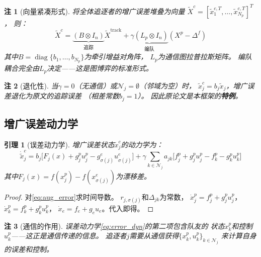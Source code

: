 \documentclass[11pt,a4paper]{article}
\newtheorem{lemma}[theorem]{引理}
\newtheorem{remark}{注}
\DeclareMathOperator{\diag}{diag}
\begin{document}
\begin{remark}[向量紧凑形式]\label{rmk:compact}
  将全体追逐者的增广误差堆叠为向量
  $\tilde{X}^c = [\tilde{x}_1^{c,T}, \ldots, \tilde{x}_{N_p}^{c,T}]^T$，
  则：
  \begin{equation}\label{eq:compact_error}
    \tilde{X}^c = \underbrace{(B \otimes I_n)}_{\text{追踪}} \tilde{X}^{\mathrm{track}}
    + \underbrace{\gamma (L_p \otimes I_n)}_{\text{编队}} (X^p - \Delta^f)
  \end{equation}
  其中$B = \diag\{b_1, \ldots, b_{N_p}\}$为牵引增益对角阵，
  $L_p$为通信图拉普拉斯矩阵。
  编队耦合完全由$L_p$决定——这是图博弈的标准形式\cite{lopez2020}。
\end{remark}

\begin{remark}[退化性]
  当$\gamma = 0$（无通信）或$\mathcal{N}_j = \emptyset$（邻域为空）时，
  $\tilde{x}_j^c = b_j \tilde{x}_j$，增广误差退化为原文的追踪误差
  （相差常数$b_j = 1$）。
  因此原论文是本框架的\textbf{特例}。
\end{remark}


\subsection{增广误差动力学}

\begin{lemma}[误差动力学]\label{lem:error_dyn}
  增广误差状态$\tilde{x}_j^c$的动力学为：
  \begin{equation}\label{eq:error_dyn}
    \dot{\tilde{x}}_j^c =
    b_j \big[F_j(x) + g_j^p u_j^p - g_{\sigma(j)}^e u_{\sigma(j)}^e\big]
    + \gamma \sum_{k \in \mathcal{N}_j} a_{jk}
      \big[f_j^p + g_j^p u_j^p - f_k^p - g_k^p u_k^p\big]
  \end{equation}
  其中$F_j(x) = f(x_j^p) - f(x_{\sigma(j)}^e)$为漂移差。
\end{lemma}

\begin{proof}
  对\eqref{eq:aug_error}求时间导数。
  $r_{j,\sigma(j)}$和$\Delta_{jk}$为常数，
  $\dot{x}_j^p = f_j^p + g_j^p u_j^p$，$\dot{x}_k^p = f_k^p + g_k^p u_k^p$，
  $\dot{x}_e = f_e + g_e u_e$。代入即得。
\end{proof}

\begin{remark}[通信的作用]\label{rmk:comm_role}
  误差动力学\eqref{eq:error_dyn}的第二项包含队友的
  状态$x_k^p$和控制$u_k^p$——这正是通信传递的信息。
  追逐者$j$需要从通信获得$\{x_k^p, u_k^p\}_{k \in \mathcal{N}_j}$
  来计算自身的误差和控制。
\end{remark}
\end{document}
